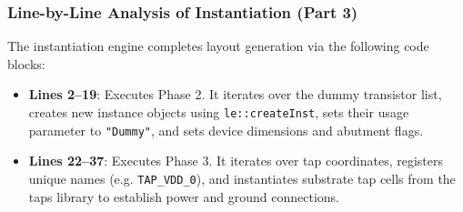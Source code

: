 \subsubsection{Line-by-Line Analysis of Instantiation (Part 3)}
The instantiation engine completes layout generation via the following code blocks:
\begin{itemize}
    \item \textbf{Lines 2--19}: Executes Phase 2. It iterates over the dummy transistor list, creates new instance objects using \texttt{le::createInst}, sets their usage parameter to \texttt{"Dummy"}, and sets device dimensions and abutment flags.
    \item \textbf{Lines 22--37}: Executes Phase 3. It iterates over tap coordinates, registers unique names (e.g. \texttt{TAP\_VDD\_0}), and instantiates substrate tap cells from the taps library to establish power and ground connections.
\end{itemize}
